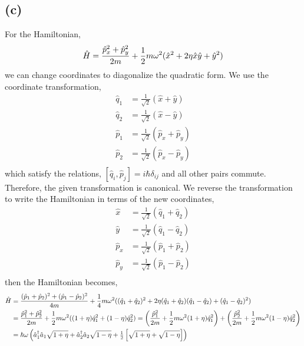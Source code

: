 \documentclass[12pt]{extarticle}
\begin{document}
\subsection*{(c)}
For the Hamiltonian, 
\[\hat{H} = \frac{\hat{p}^2_x + \hat{p}^2_y}{2m} + \frac{1}{2} m \omega^2 (\hat{x}^2 + 2 \eta \hat{x} \hat{y} + \hat{y}^2)\]
we can change coordinates to diagonalize the quadratic form. We use the coordinate transformation,
\begin{align*}
\hat{q}_1 & = \tfrac{1}{\sqrt{2}} \left( \hat{x} + \hat{y} \right) \\
\hat{q}_2 & = \tfrac{1}{\sqrt{2}}  \left( \hat{x} - \hat{y} \right) \\
\hat{p}_1 & = \tfrac{1}{\sqrt{2}}  \left( \hat{p}_x + \hat{p}_y \right) \\
\hat{p}_2 & = \tfrac{1}{\sqrt{2}}  \left( \hat{p}_x - \hat{p}_y \right) \\
\end{align*}
which satisfy the relations, $[\hat{q}_i, \hat{p}_j] =  i \hbar \delta_{ij}$ and all other pairs commute. Therefore, the given transformation is canonical. We reverse the transformation to write the Hamiltonian in terms of the new coordinates,
\begin{align*}
\hat{x} & = \tfrac{1}{\sqrt{2}}  \left( \hat{q}_1 + \hat{q}_2 \right) \\
\hat{y} & = \tfrac{1}{\sqrt{2}}  \left( \hat{q}_1 - \hat{q}_2 \right) \\
\hat{p}_x & = \tfrac{1}{\sqrt{2}}  \left( \hat{p}_1 + \hat{p}_2 \right)  \\
\hat{p}_y & = \tfrac{1}{\sqrt{2}} \left( \hat{p}_1 - \hat{p}_2 \right) \\
\end{align*}
then the Hamiltonian becomes,
\begin{align*}
\hat{H} & = \frac{( \hat{p}_1 + \hat{p}_2)^2 + ( \hat{p}_1 - \hat{p}_2)^2}{4m} + \frac{1}{4} m \omega^2 (( \hat{q}_1 + \hat{q}_2)^2 + 2 \eta ( \hat{q}_1 + \hat{q}_2)( \hat{q}_1 - \hat{q}_2)  + (\hat{q}_1 - \hat{q}_2)^2) \\
& = \frac{\hat{p}^2_1 + \hat{p}^2_2}{2m} + \frac{1}{2} m \omega^2 ((1 + \eta) \hat{q}_1^2 + (1 - \eta) \hat{q}_2^2) = \left( \frac{\hat{p}^2_1}{2m} + \frac{1}{2} m \omega^2 (1 + \eta) \hat{q}_1^2 \right) + \left( \frac{\hat{p}^2_2}{2m} + \frac{1}{2} m \omega^2 (1 - \eta) \hat{q}_2^2 \right) \\ & = \hbar \omega \left( \hat{a}^\dagger_1 \hat{a}_1 \sqrt{1 + \eta} + \hat{a}^\dagger_2 \hat{a}_2 \sqrt{1 - \eta}  + \tfrac{1}{2} \left[ \sqrt{1 + \eta} + \sqrt{1 - \eta} \right] \right)
\end{align*}
\end{document}
